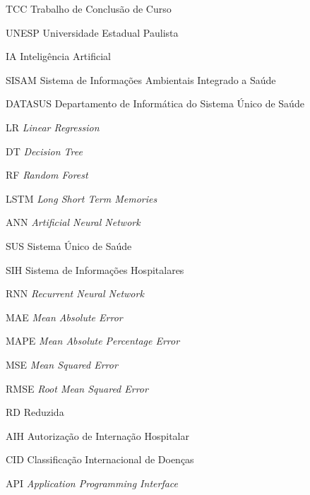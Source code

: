 \documentclass[
  12pt,		%
  a4paper,	%
  openright,%
  oneside,	%
  chapter=TITLE,		%
  section=TITLE,		%
  english,	%
  french,	%
  spanish,	%
  brazil	%
]{abntex2}
\begin{document}
    
    \listoftables*
    \newpage
    
    
    \begin{siglas}
        \item[TCC] Trabalho de Conclusão de Curso
        \item[UNESP] Universidade Estadual Paulista
        \item[IA] Inteligência Artificial
        \item[SISAM] Sistema de Informações Ambientais Integrado a Saúde
        \item[DATASUS] Departamento de Informática do Sistema Único de Saúde
        \item[LR] \textit{Linear Regression}
        \item[DT] \textit{Decision Tree} 
        \item[RF] \textit{Random Forest}
        \item[LSTM] \textit{Long Short Term Memories}
        \item[ANN] \textit{Artificial Neural Network} 
        \item[SUS] Sistema Único de Saúde
        \item[SIH] Sistema de Informações Hospitalares
        \item[RNN] \textit{Recurrent Neural Network}
        \item[MAE] \textit{Mean Absolute Error}
        \item[MAPE] \textit{Mean Absolute Percentage Error}
        \item[MSE] \textit{Mean Squared Error}
        \item[RMSE] \textit{Root Mean Squared Error}
        \item[RD] Reduzida
        \item[AIH] Autorização de Internação Hospitalar
        \item[CID] Classificação Internacional de Doenças
        \item[API] \textit{Application Programming Interface}
    \end{siglas}
    
\end{document}
